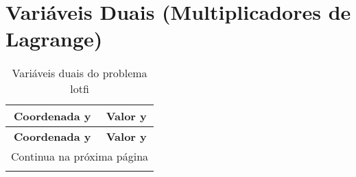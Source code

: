 \documentclass[12pt]{article}
\begin{document}
\section{Variáveis Duais (Multiplicadores de Lagrange)}

\begin{longtable}{@{}cc@{}}
\caption{Variáveis duais do problema lotfi} \\
\toprule
\textbf{Coordenada y} & \textbf{Valor y} \\
\midrule
\endfirsthead

\toprule
\textbf{Coordenada y} & \textbf{Valor y} \\
\midrule
\endhead

\midrule \multicolumn{2}{r}{{Continua na próxima página}} \\ \midrule
\endfoot


\end{longtable}
\end{document}
